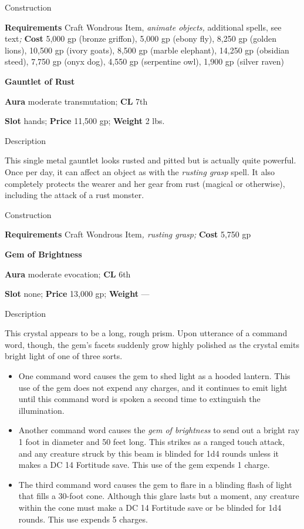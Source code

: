 Construction
				
\textbf{Requirements} Craft Wondrous Item, \textit{animate objects, }additional spells, see text\textit{;}\textbf{ Cost }5,000 gp (bronze griffon), 5,000 gp (ebony fly), 8,250 gp (golden lions), 10,500 gp (ivory goats), 8,500 gp (marble elephant), 14,250 gp (obsidian steed), 7,750 gp (onyx dog), 4,550 gp (serpentine owl), 1,900 gp (silver raven)
				
\textbf{Gauntlet of Rust}
				
\textbf{Aura} moderate transmutation;\textbf{ CL }7th
				
\textbf{Slot} hands; \textbf{Price} 11,500 gp; \textbf{Weight} 2 lbs.
				
Description
				
This single metal gauntlet looks rusted and pitted but is actually quite powerful. Once per day, it can affect an object as with the \textit{rusting grasp} spell. It also completely protects the wearer and her gear from rust (magical or otherwise), including the attack of a rust monster. 
				
Construction
				
\textbf{Requirements} Craft Wondrous Item\textit{, rusting grasp;}\textbf{ Cost }5,750 gp
				
\textbf{Gem of Brightness}
				
\textbf{Aura} moderate evocation;\textbf{ CL }6th
				
\textbf{Slot} none; \textbf{Price} 13,000 gp; \textbf{Weight }---
				
Description
				
This crystal appears to be a long, rough prism. Upon utterance of a command word, though, the gem's facets suddenly grow highly polished as the crystal emits bright light of one of three sorts.
				\begin{itemize}\item  One command word causes the gem to shed light as a hooded lantern. This use of the gem does not expend any charges, and it continues to emit light until this command word is spoken a second time to extinguish the illumination.
				\item  Another command word causes the \textit{gem of brightness} to send out a bright ray 1 foot in diameter and 50 feet long. This strikes as a ranged touch attack, and any creature struck by this beam is blinded for 1d4 rounds unless it makes a DC 14 Fortitude save. This use of the gem expends 1 charge.
				\item  The third command word causes the gem to flare in a blinding flash of light that fills a 30-foot cone. Although this glare lasts but a moment, any creature within the cone must make a DC 14 Fortitude save or be blinded for 1d4 rounds. This use expends 5 charges.
\end{itemize}
				
